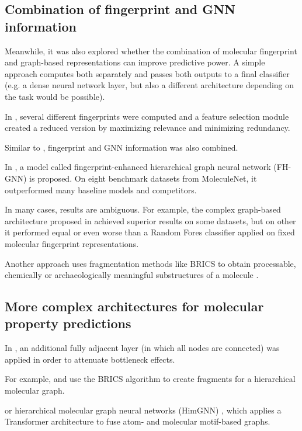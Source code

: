 \subsection{Combination of fingerprint and GNN information}

Meanwhile, it was also explored whether the combination of molecular fingerprint and graph-based representations can improve predictive power. A simple approach computes both separately and passes both outputs to a final classifier (e.g. a dense neural network layer, but also a different architecture depending on the task would be possible).

In \cite{Zhang.2024}, several different fingerprints were computed and a feature selection module created a reduced version by maximizing relevance and minimizing redundancy. 

Similar to \cite{Zhang.2024}, fingerprint and GNN information was also combined.


In \cite{Liu.2025}, a model called fingerprint-enhanced hierarchical graph neural network (FH-GNN) is proposed.
On eight benchmark datasets from MoleculeNet, it outperformed many baseline models and competitors.  


In many cases, results are ambiguous. For example, the complex graph-based architecture proposed in \cite{Yang.2019} achieved superior results on some datasets, but on other it performed equal or even worse than a Random Fores classifier applied on fixed molecular fingerprint representations.

Another approach uses fragmentation methods like BRICS to obtain processable, chemically or archaeologically meaningful substructures of a molecule \cite{Degen.2008,Jinsong.2024,ZhangBRICS.2024,Liu.2017,Diao.2023}.


\subsection{More complex architectures for molecular property predictions}


In \cite{Alon.09.06.2020}, an additional fully adjacent layer (in which all nodes are connected) was applied in order to attenuate bottleneck effects.

For example, \cite{Liu.2025} and \cite{Zang.2023} use the BRICS algorithm to create fragments for a hierarchical molecular graph.


or hierarchical molecular graph neural networks (HimGNN) \cite{Han.2023}, which applies a Transformer architecture to fuse atom- and molecular motif-based graphs.

